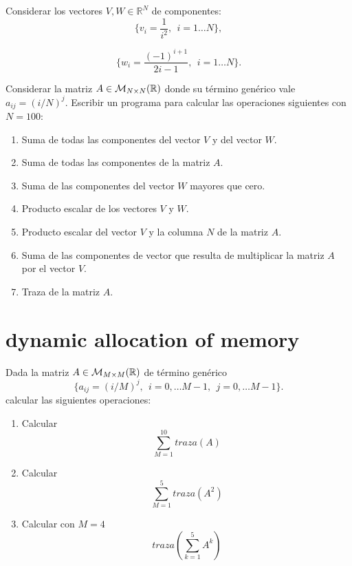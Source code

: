    
   
   
   Considerar los vectores 
   $V, W \in \mathbb{R}^N$ 
   de componentes: 
   $$
   \{ v_i =\frac{1}{i^2}, \ \ i = 1 \ldots  N \},
   $$
   
   $$
   \{ w_i = \frac{(-1)^{i+1}}{2i-1}, \ \ i = 1 \ldots  N \}.
   $$
   
   
   
   Considerar la matriz $A \in {\cal M}_{N \times N} (\mathbb{R})$ donde su término genérico vale 
   $ a_{ij} = (i/N)^j $. 
   Escribir un programa para calcular  las operaciones siguientes con $N=100$: 
   \begin{enumerate}
    \item Suma de  todas las componentes del vector $V$ y del vector $ W$. 
    \item Suma de  todas las componentes de la matriz $A$.   
    \item Suma de  las componentes del vector $W$ mayores que cero.
    \item Producto escalar de los vectores $V$ y $W$.   
    \item Producto escalar del vector $V$ y la columna $N$ de la matriz $A$. 
    \item Suma de las componentes de vector que resulta de  multiplicar la matriz $A$ por el vector $V$.
    \item Traza de la matriz $A$.
   \end{enumerate}
   
   
   
   
   
   
   \section{dynamic allocation of memory   \label{memoria_dinamica} }
   
   
   Dada la matriz  $A \in {\cal M}_{M \times M} (\mathbb{R})$  de término genérico 
   $$
   \{ a_{ij} = (i/M)^j, \ \ i=0, \ldots M-1, \ \  j=0, \ldots M-1 \}. 
   $$
   calcular las siguientes operaciones: 
   
   
   \begin{enumerate}    
    \item Calcular 
    $$  \sum_{M=1} ^{10} traza(A) $$ 
    \item Calcular 
    $$  \sum_{M=1} ^{5} traza(A^2) $$ 
    \item Calcular  con $ M=4 $
    $$  traza \left( \sum_{k=1} ^{5} A^k  \right) $$
   \end{enumerate}     
   
